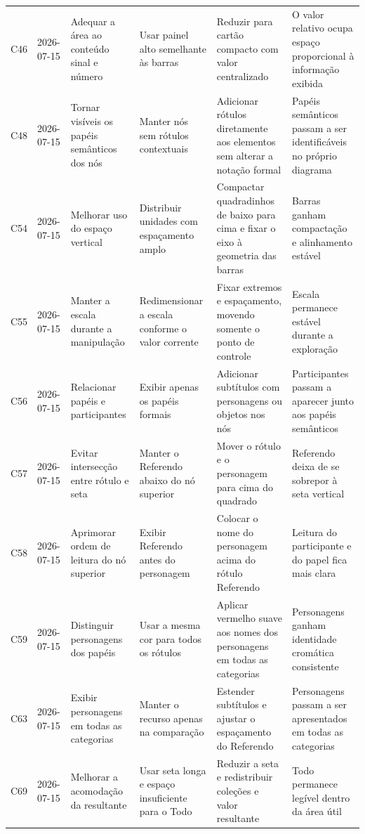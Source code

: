 \begin{landscape}
\begin{longtable}{p{1.0cm}p{1.9cm}p{4.0cm}p{5.0cm}p{6.2cm}p{5.7cm}}
\addlinespace[2pt]
C46 & 2026-07-15 & Adequar a área ao conteúdo sinal e número & Usar painel alto semelhante às barras & Reduzir para cartão compacto com valor centralizado & O valor relativo ocupa espaço proporcional à informação exibida \\
\addlinespace[2pt]
C48 & 2026-07-15 & Tornar visíveis os papéis semânticos dos nós & Manter nós sem rótulos contextuais & Adicionar rótulos diretamente aos elementos sem alterar a notação formal & Papéis semânticos passam a ser identificáveis no próprio diagrama \\
\addlinespace[2pt]
C54 & 2026-07-15 & Melhorar uso do espaço vertical & Distribuir unidades com espaçamento amplo & Compactar quadradinhos de baixo para cima e fixar o eixo à geometria das barras & Barras ganham compactação e alinhamento estável \\
\addlinespace[2pt]
C55 & 2026-07-15 & Manter a escala durante a manipulação & Redimensionar a escala conforme o valor corrente & Fixar extremos e espaçamento, movendo somente o ponto de controle & Escala permanece estável durante a exploração \\
\addlinespace[2pt]
C56 & 2026-07-15 & Relacionar papéis e participantes & Exibir apenas os papéis formais & Adicionar subtítulos com personagens ou objetos nos nós & Participantes passam a aparecer junto aos papéis semânticos \\
\addlinespace[2pt]
C57 & 2026-07-15 & Evitar intersecção entre rótulo e seta & Manter o Referendo abaixo do nó superior & Mover o rótulo e o personagem para cima do quadrado & Referendo deixa de se sobrepor à seta vertical \\
\addlinespace[2pt]
C58 & 2026-07-15 & Aprimorar ordem de leitura do nó superior & Exibir Referendo antes do personagem & Colocar o nome do personagem acima do rótulo Referendo & Leitura do participante e do papel fica mais clara \\
\addlinespace[2pt]
C59 & 2026-07-15 & Distinguir personagens dos papéis & Usar a mesma cor para todos os rótulos & Aplicar vermelho suave aos nomes dos personagens em todas as categorias & Personagens ganham identidade cromática consistente \\
\addlinespace[2pt]
C63 & 2026-07-15 & Exibir personagens em todas as categorias & Manter o recurso apenas na comparação & Estender subtítulos e ajustar o espaçamento do Referendo & Personagens passam a ser apresentados em todas as categorias \\
\addlinespace[2pt]
C69 & 2026-07-15 & Melhorar a acomodação da resultante & Usar seta longa e espaço insuficiente para o Todo & Reduzir a seta e redistribuir coleções e valor resultante & Todo permanece legível dentro da área útil \\

\end{longtable}
\end{landscape}
